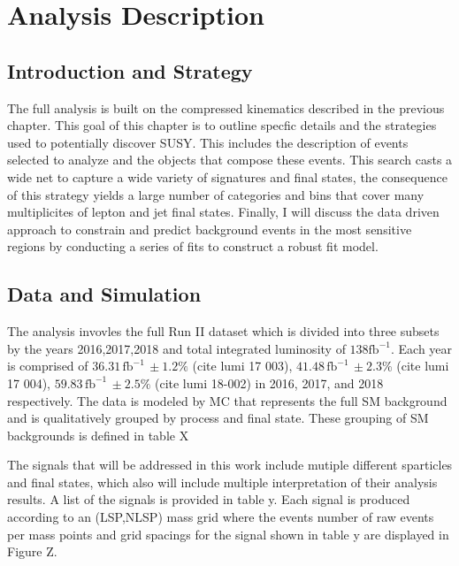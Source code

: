 
\setcounter{secnumdepth}{3}
\setcounter{tocdepth}{3}
\setlength{\parskip}{\smallskipamount}
\setlength{\parindent}{0pt}


\makeatletter


\providecommand{\tabularnewline}{\\}


\makeatother

%

\chapter{Analysis Description }

\section{Introduction and Strategy}
The full analysis is built on the compressed kinematics described in the previous chapter. This goal of this chapter is to outline specfic details and the strategies used to potentially discover SUSY. This includes the description of events selected to analyze and the objects that compose these events. This search casts a wide net to capture a wide variety of signatures and final states, the consequence of this strategy yields a large number of categories and bins that cover many multiplicites of lepton and jet final states. Finally, I will discuss the data driven approach to constrain and predict background events in the most sensitive regions by conducting a series of fits to construct a robust fit model.


\section{ Data and Simulation}
The analysis invovles the full Run II dataset which is divided into three subsets by the years 2016,2017,2018 and total integrated luminosity of $138 \text{fb}^{-1}$. Each year is comprised of $36.31 \, \text{fb}^{-1} \, \pm 1.2\%$ (cite lumi 17 003), $41.48 \, \text{fb}^{-1} \, \pm 2.3\%$ (cite lumi 17 004), $59.83 \, \text{fb}^{-1} \, \pm2.5\%$ (cite lumi 18-002) in 2016, 2017, and 2018 respectively. The data is modeled by MC that represents the full SM background and is qualitatively grouped by process and final state. These grouping of SM backgrounds is defined in table X


The signals that will be addressed in this work include mutiple different sparticles and final states, which also will include multiple interpretation of their analysis results. A list of the signals is provided in table y. Each signal is produced according to an (LSP,NLSP) mass grid where the events number of raw events per mass points and grid spacings for the signal shown in table y are displayed in Figure Z.

